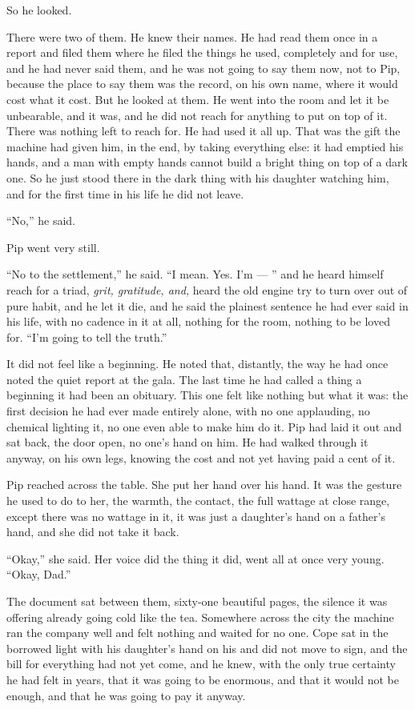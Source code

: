 \documentclass[11pt,openany]{book}
\begin{document}
So he looked.

There were two of them. He knew their names. He had read them once in a report and filed them where he filed the things he used, completely and for use, and he had never said them, and he was not going to say them now, not to Pip, because the place to say them was the record, on his own name, where it would cost what it cost. But he looked at them. He went into the room and let it be unbearable, and it was, and he did not reach for anything to put on top of it. There was nothing left to reach for. He had used it all up. That was the gift the machine had given him, in the end, by taking everything else: it had emptied his hands, and a man with empty hands cannot build a bright thing on top of a dark one. So he just stood there in the dark thing with his daughter watching him, and for the first time in his life he did not leave.

``No,'' he said.

Pip went very still.

``No to the settlement,'' he said. ``I mean. Yes. I'm --- '' and he heard himself reach for a triad, \textit{grit, gratitude, and,} heard the old engine try to turn over out of pure habit, and he let it die, and he said the plainest sentence he had ever said in his life, with no cadence in it at all, nothing for the room, nothing to be loved for. ``I'm going to tell the truth.''

It did not feel like a beginning. He noted that, distantly, the way he had once noted the quiet report at the gala. The last time he had called a thing a beginning it had been an obituary. This one felt like nothing but what it was: the first decision he had ever made entirely alone, with no one applauding, no chemical lighting it, no one even able to make him do it. Pip had laid it out and sat back, the door open, no one's hand on him. He had walked through it anyway, on his own legs, knowing the cost and not yet having paid a cent of it.

Pip reached across the table. She put her hand over his hand. It was the gesture he used to do to her, the warmth, the contact, the full wattage at close range, except there was no wattage in it, it was just a daughter's hand on a father's hand, and she did not take it back.

``Okay,'' she said. Her voice did the thing it did, went all at once very young. ``Okay, Dad.''

The document sat between them, sixty-one beautiful pages, the silence it was offering already going cold like the tea. Somewhere across the city the machine ran the company well and felt nothing and waited for no one. Cope sat in the borrowed light with his daughter's hand on his and did not move to sign, and the bill for everything had not yet come, and he knew, with the only true certainty he had felt in years, that it was going to be enormous, and that it would not be enough, and that he was going to pay it anyway.
\end{document}
